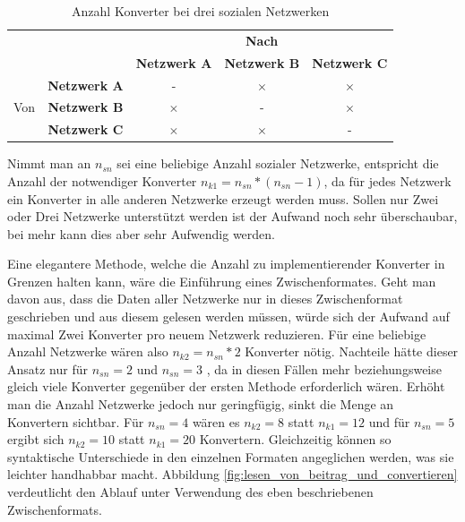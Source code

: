 \begin{table}[ht]
    \centering
    \caption{Anzahl Konverter bei drei sozialen Netzwerken}
    
    \begin{tabular}{c|c|c|c|c}
        \multicolumn{2}{c|}{\multirow{2}{*}{}} & 
        \multicolumn{3}{|c}{\textbf{Nach}}   \\ 
        \cline{3-5} 

        \multicolumn{2}{c|}{} & 
        \textbf{Netzwerk A} & 
        \textbf{Netzwerk B} & 
        \textbf{Netzwerk C} \\ 
        \hline

        \multirow{3}{*}{Von} & 
        \textbf{Netzwerk A} & 
        -&            
        $ \times $ &            
        $ \times $ \\ 
        \cline{2-5} 

        & 
        \textbf{Netzwerk B} &            
        $ \times $ &            
        -&            
        $ \times $ \\ 
        \cline{2-5} 
         
        & 
        \textbf{Netzwerk C} &            
        $ \times $ &            
        $ \times $ &            
        -\\
    \end{tabular}
    \label{tbl:anzahl_konvertern_bei_drei_netzwerken}
\end{table}

Nimmt man an $n_{sn}$ sei eine beliebige Anzahl sozialer Netzwerke, entspricht die Anzahl der notwendiger Konverter $ n_{k1}= n_{sn}*(n_{sn}-1) $, da für jedes Netzwerk ein Konverter in alle anderen Netzwerke erzeugt werden muss. Sollen nur Zwei oder Drei Netzwerke unterstützt werden ist der Aufwand noch sehr überschaubar, bei mehr kann dies aber sehr Aufwendig werden. 

\medskip

Eine elegantere Methode, welche die Anzahl zu implementierender Konverter in Grenzen halten kann, wäre die Einführung eines Zwischenformates. Geht man davon aus, dass die Daten aller Netzwerke nur in dieses Zwischenformat geschrieben und aus diesem gelesen werden müssen, würde sich der Aufwand auf maximal Zwei Konverter pro neuem Netzwerk reduzieren. Für eine beliebige Anzahl Netzwerke wären also $ n_{k2} = n_{sn} * 2 $ Konverter nötig. Nachteile hätte dieser Ansatz nur für $ n_{sn}=2 $ und $ n_{sn}=3$ , da in diesen Fällen mehr beziehungsweise gleich viele Konverter gegenüber der ersten Methode erforderlich wären. Erhöht man die Anzahl Netzwerke jedoch nur geringfügig, sinkt die Menge an Konvertern sichtbar. Für $ n_{sn} = 4 $ wären es $ n_{k2} = 8 $ statt $ n_{k1} = 12 $ und für $ n_{sn} = 5 $ ergibt sich $ n_{k2} = 10 $ statt $ n_{k1} = 20 $ Konvertern. Gleichzeitig können so syntaktische Unterschiede in den einzelnen Formaten angeglichen werden, was sie leichter handhabbar macht. Abbildung \ref{fig:lesen_von_beitrag_und_convertieren} verdeutlicht den Ablauf unter Verwendung des eben beschriebenen Zwischenformats.

